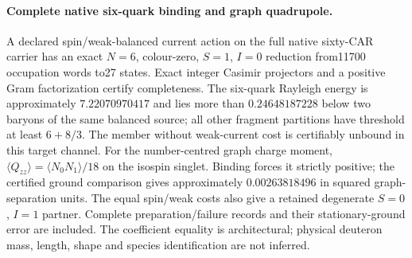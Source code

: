 \paragraph{Complete native six-quark binding and graph quadrupole.}
A declared spin/weak-balanced current action on the full native sixty-CAR
carrier has an exact $N=6$, colour-zero, $S=1$, $I=0$ reduction from11700
occupation words to27 states. Exact integer Casimir projectors and a positive
Gram factorization certify completeness. The six-quark Rayleigh energy is
approximately $7.22070970417$ and lies more than $0.24648187228$ below two
baryons of the same balanced source; all other fragment partitions have
threshold at least $6+8/3$. The member without weak-current cost is
certifiably unbound in this target channel.
For the number-centred graph charge moment,
$\langle Q_{zz}\rangle=\langle N_0N_1\rangle/18$ on the isospin singlet.
Binding forces it strictly positive; the certified ground comparison gives
approximately $0.00263818496$ in squared graph-separation units. The equal
spin/weak costs also give a retained degenerate $S=0$, $I=1$ partner.
Complete preparation/failure records and their stationary-ground error are
included. The coefficient equality is architectural; physical deuteron mass,
length, shape and species identification are not inferred.
